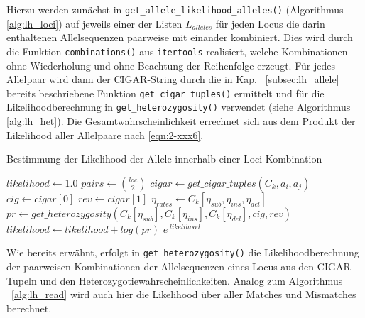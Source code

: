 Hierzu werden zunächst in \lstinline|get_allele_likelihood_alleles()| (Algorithmus \ref{alg:lh_loci}) auf jeweils einer der Listen $L_{alleles}$ für jeden Locus die darin enthaltenen Allelsequenzen paarweise mit einander kombiniert. Dies wird durch die Funktion \lstinline|combinations()| aus \lstinline|itertools| realisiert, welche Kombinationen ohne Wiederholung und ohne Beachtung der Reihenfolge erzeugt. Für jedes Allelpaar wird dann der CIGAR-String durch die in Kap. ~\ref{subsec:lh_allele} bereits beschriebene Funktion \lstinline|get_cigar_tuples()| ermittelt und für die Likelihoodberechnung in \lstinline|get_heterozygosity()| verwendet (siehe Algorithmus \ref{alg:lh_het}). Die Gesamtwahrscheinlichkeit errechnet sich aus dem Produkt der Likelihood aller Allelpaare nach \ref{eqn:2-xxx6}.

\begin{algorithm}[H]
	\caption{Bestimmung der Likelihood der Allele innerhalb einer Loci-Kombination}  \label{alg:lh_loci}
	\begin{algorithmic}[1]	
		\State $ likelihood \gets 1.0 $
		    \State $ pairs \gets \binom{loc}{2}$
		    \State $cigar \gets get\_cigar\_tuples(C_{k}, a_{i}, a_{j})$  
			        \State $cig \gets cigar[0]$
			        \State $rev \gets cigar[1]$
			        \State $ \eta_{rates} \gets C_{k}[\eta_{sub}, \eta_{ins}, \eta_{del}]$
			        \State $pr \gets get\_heterozygosity(C_{k}[\eta_{sub}], C_{k}[\eta_{ins}], C_{k}[\eta_{del}], cig, rev)$  
			    	\State $ likelihood \gets likelihood + log(pr)$    
			    \EndIf
			\EndFor
		\EndFor
		\State \Return $ e^{\;likelihood} $
		\EndFunction
	\end{algorithmic}
\end{algorithm}

Wie bereits erwähnt, erfolgt in \lstinline|get_heterozygosity()| die Likelihoodberechnung der paarweisen Kombinationen der Allelsequenzen eines Locus aus den CIGAR-Tupeln und den Heterozygotiewahrscheinlichkeiten. Analog zum Algorithmus ~\ref{alg:lh_read} wird auch hier die Likelihood über aller Matches und Mismatches berechnet.\\

